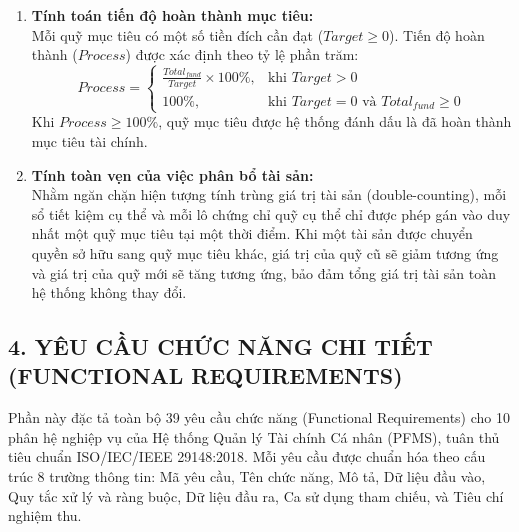 \documentclass[11pt,a4paper]{article}
\providecommand{\tightlist}{
  \setlength{\itemsep}{0pt}\setlength{\parskip}{0pt}}
\newif\ifsmartsectionbreak
\newcommand{\EnableSmartSectionBreaks}{\smartsectionbreaktrue}
\begin{document}
\begin{enumerate}
  \begin{itemize}
  \tightlist
  \item
    Tiền mặt phân bổ (\texttt{Cash}): Số tiền được chỉ định phân bổ từ
    bảng tiền mặt dành riêng cho quỹ (\texttt{funds\_cash}).
  \item
    Sổ tiết kiệm liên kết (\texttt{Savings}): Tổng số dư hiện tại của
    tất cả các sổ tiết kiệm có gắn mã tham chiếu tới quỹ đó.
  \item
    Chứng chỉ quỹ liên kết (\texttt{FundCerts}): Tổng giá trị thị trường
    hiện tại của tất cả các khoản chứng chỉ quỹ có gắn mã tham chiếu tới
    quỹ đó. Tổng giá trị tích lũy của một quỹ (\(Total_{fund}\)) được
    xác định:
    \[
    Total_{fund}=Cash_{fund}+\sum_{s\in Savings_{fund}}Balance_s+\sum_{c\in FundCerts_{fund}}Balance_c
    \]
  \end{itemize}
\item
  \textbf{Tính toán tiến độ hoàn thành mục tiêu:}\\
  Mỗi quỹ mục tiêu có một số tiền đích cần đạt (\(Target \ge 0\)). Tiến
  độ hoàn thành (\(Process\)) được xác định theo tỷ lệ phần trăm:
  \[Process = \begin{cases} \frac{Total_{fund}}{Target} \times 100\%, & \text{khi } Target > 0 \\ 100\%, & \text{khi } Target = 0 \text{ và } Total_{fund} \ge 0 \end{cases}\]
  Khi \(Process \ge 100\%\), quỹ mục tiêu được hệ thống đánh dấu là đã
  hoàn thành mục tiêu tài chính.
\item
  \textbf{Tính toàn vẹn của việc phân bổ tài sản:}\\
  Nhằm ngăn chặn hiện tượng tính trùng giá trị tài sản
  (double-counting), mỗi sổ tiết kiệm cụ thể và mỗi lô chứng chỉ quỹ cụ
  thể chỉ được phép gán vào duy nhất một quỹ mục tiêu tại một thời điểm.
  Khi một tài sản được chuyển quyền sở hữu sang quỹ mục tiêu khác, giá
  trị của quỹ cũ sẽ giảm tương ứng và giá trị của quỹ mới sẽ tăng tương
  ứng, bảo đảm tổng giá trị tài sản toàn hệ thống không thay đổi.
\end{enumerate}

\clearpage
\EnableSmartSectionBreaks
\subsection{4. YÊU CẦU CHỨC NĂNG CHI TIẾT (FUNCTIONAL
REQUIREMENTS)}\label{4-yuxeau-cux1ea7u-chux1ee9c-nux103ng-chi-tiux1ebft-functional-requirements}

Phần này đặc tả toàn bộ 39 yêu cầu chức năng (Functional Requirements)
cho 10 phân hệ nghiệp vụ của Hệ thống Quản lý Tài chính Cá nhân (PFMS),
tuân thủ tiêu chuẩn ISO/IEC/IEEE 29148:2018. Mỗi yêu cầu được chuẩn hóa
theo cấu trúc 8 trường thông tin: Mã yêu cầu, Tên chức năng, Mô tả, Dữ
liệu đầu vào, Quy tắc xử lý và ràng buộc, Dữ liệu đầu ra, Ca sử dụng
tham chiếu, và Tiêu chí nghiệm thu.
\end{document}
